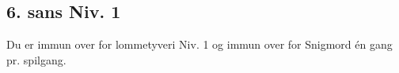\subsection*{6. sans Niv. 1}
Du er immun over for lommetyveri Niv. 1 og immun over for Snigmord én gang pr. spilgang.\\
